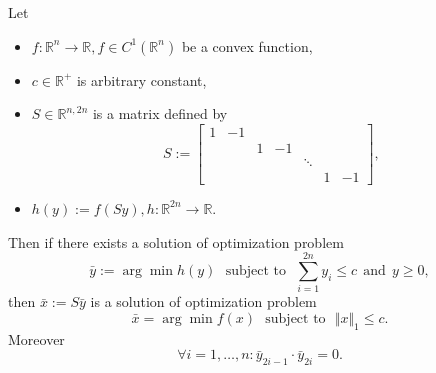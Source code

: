 \begin{theorem}
Let
\begin{itemize}
 \item $f: \mathbb{R}^n \rightarrow \mathbb{R}, f \in C^1(\mathbb{R}^n)$ be a convex function,
 \item $c \in \mathbb{R}^{+}$ is arbitrary constant,
 \item $S \in \mathbb{R}^{n,2n}$ is a matrix defined by
 \begin{displaymath}
  S := 
  \left[
   \begin{array}{ccccccc}
     1 & -1 & & & & & \\
      &  & 1 & -1 & & & \\
      &  & &  & \ddots & & \\
      &  &  &  & & 1 & -1 
   \end{array}
  \right],
 \end{displaymath}
 \item $h(y) := f(Sy), h: \mathbb{R}^{2n} \rightarrow \mathbb{R}$.
\end{itemize}
Then if there exists a solution of optimization problem
\begin{equation}
 \label{eq:absvalconstr1}
 \bar{y} := \arg \min h(y) ~~~ \textrm{subject to} ~~~ \sum\limits_{i=1}^{2n} y_i \leq c ~~ \textrm{and} ~~ y \geq 0,
\end{equation}
then $\bar{x} := S \bar{y}$ is a solution of optimization problem
\begin{equation}
 \label{eq:absvalconstr2}
 \bar{x} = \arg \min f(x) ~~~ \textrm{subject to} ~~~ \Vert x \Vert_1 \leq c.
\end{equation}
Moreover
\begin{equation}
 \label{eq:absvalconstr3}
\forall i = 1,\dots,n: \bar{y}_{2i-1} \cdot \bar{y}_{2i} = 0.
\end{equation}
\end{theorem}

